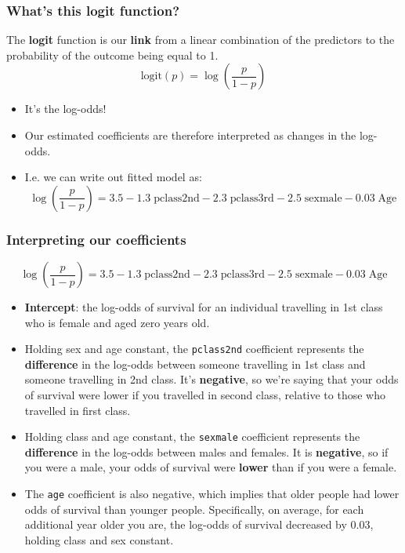 \documentclass[a4paper]{article}\usepackage[]{graphicx}\usepackage[]{xcolor}
\begin{document}
\subsubsection{What's this logit function?}
The \textbf{logit} function is our \textbf{link} from a linear combination of the predictors to the probability of the outcome being equal to 1.
\[
	\mathrm{logit}(p) = \log\left(\frac{p}{1-p}\right)
\]
\begin{itemize}
	\item It's the log-odds!
	\item Our estimated coefficients are therefore interpreted as changes in the log-odds.
	\item I.e. we can write out fitted model as:
	\[  
		\log\left(\frac{p}{1-p}\right) = 3.5 - 1.3\;\text{pclass2nd} - 2.3\;\text{pclass3rd} - 2.5\;\text{sexmale} - 0.03\;\text{Age}
	\]
\end{itemize}
\subsubsection{Interpreting our coefficients}
\[
	\log\left(\frac{p}{1-p}\right) = 3.5 - 1.3\;\text{pclass2nd} - 2.3\;\text{pclass3rd} - 2.5\;\text{sexmale} - 0.03\;\text{Age}
\]
\begin{itemize}
	\item \textbf{Intercept}: the log-odds of survival for an individual travelling in 1st class who is female and aged zero years old.
	\item Holding sex and age constant, the \lstinline|pclass2nd| coefficient represents the \textbf{difference} in the log-odds between someone travelling in 1st class and someone travelling in 2nd class. It's \textbf{negative}, so we're saying that your odds of survival were lower if you travelled in second class, relative to those who travelled in first class.
	\item Holding class and age constant, the \lstinline|sexmale| coefficient represents the \textbf{difference} in the log-odds between males and females. It is \textbf{negative}, so if you were a male, your odds of survival were \textbf{lower} than if you were a female.
	\item The \lstinline|age| coefficient is also negative, which implies that older people had lower odds of survival than younger people. Specifically, on average, for each additional year older you are, the log-odds of survival decreased by 0.03, holding class and sex constant.
\end{itemize}
\end{document}
